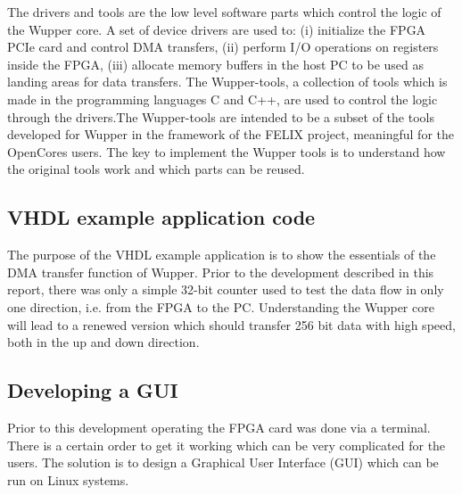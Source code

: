 
The drivers and tools are the low level software parts which control the logic of the Wupper core. A set of device drivers are used to: (i) initialize the FPGA PCIe card and control DMA transfers, (ii) perform I/O operations on registers inside the FPGA, (iii) allocate memory buffers in the host PC to be used as landing areas for data transfers.
The Wupper-tools, a collection of tools which is made in the programming languages C and C++, are used to control the logic through the drivers.The Wupper-tools are intended to be a subset of the tools developed for Wupper in the framework of the FELIX project, meaningful for the OpenCores users. The key to implement the Wupper tools is to understand how the original tools work and which parts can be reused.


\subsection {VHDL example application code}
The purpose of the VHDL example application is to show the essentials of the DMA transfer function of Wupper. Prior to the development described in this report, there was only a simple 32-bit counter used to test the data flow in only one direction, i.e. from the FPGA to the PC. Understanding the Wupper core will lead to a renewed version which should transfer 256 bit data with high speed, both in the up and down direction.

\subsection {Developing a GUI}
Prior to this development operating the FPGA card was done via a terminal. There is a certain order to get it working which can be very complicated for the users. The solution is to design a Graphical User Interface (GUI) which can be run on Linux systems.
